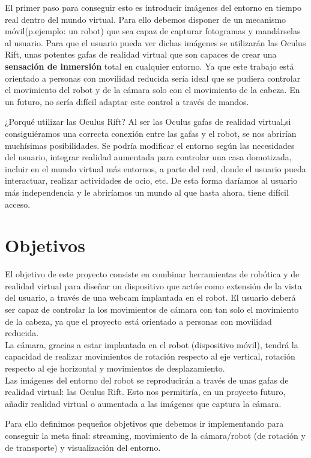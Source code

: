 \documentclass[twoside, 11pt]{epstfg}
\begin{document}
El primer paso para conseguir esto es introducir imágenes del entorno en tiempo real dentro del mundo virtual. Para ello debemos disponer de un mecanismo móvil(p.ejemplo: un robot) que sea capaz de capturar fotogramas y mandárselas al usuario.  
Para que el usuario pueda ver dichas imágenes se utilizarán las Oculus Rift, unas potentes gafas de realidad virtual que son capaces de crear una \textbf{sensación de inmersión} total en cualquier entorno.
Ya que este trabajo está orientado a personas con movilidad reducida sería ideal que se pudiera controlar el movimiento del robot y de la cámara solo con el movimiento de la cabeza. En un futuro, no sería difícil adaptar este control a través de mandos.

¿Porqué utilizar las Oculus Rift?  Al ser las Oculus gafas de realidad virtual,si consiguiéramos una correcta conexión entre las gafas y el robot, se nos abrirían muchísimas posibilidades. Se podría modificar el entorno según las necesidades del usuario, integrar realidad aumentada para controlar una casa domotizada, incluir en el mundo virtual más entornos, a parte del real, donde el usuario pueda interactuar, realizar actividades de ocio, etc.
De esta forma daríamos al usuario más independencia y le abriríamos un mundo al que hasta ahora, tiene difícil acceso.

\section{Objetivos}\label{Objetivos}
El objetivo de este proyecto consiste en combinar herramientas de robótica y de realidad virtual para diseñar un dispositivo que actúe como extensión de la vista del usuario, a través de una webcam implantada en el robot. El usuario deberá ser capaz de controlar la los movimientos de cámara con tan solo el movimiento de la cabeza, ya que el proyecto está orientado a personas con movilidad reducida.\\La cámara, gracias a estar implantada en el robot (dispositivo móvil), tendrá la capacidad de realizar movimientos de rotación respecto al eje vertical, rotación respecto al eje horizontal y movimientos de desplazamiento.\\
Las imágenes del entorno del robot se reproducirán a través de unas gafas de realidad virtual: las Oculus Rift. Esto nos permitiría, en un proyecto futuro, añadir realidad virtual o aumentada a las imágenes que captura la cámara.

Para ello definimos pequeños objetivos que debemos ir implementando para conseguir la meta final: streaming, movimiento de la cámara/robot (de rotación y de transporte) y visualización del entorno.
\end{document}
